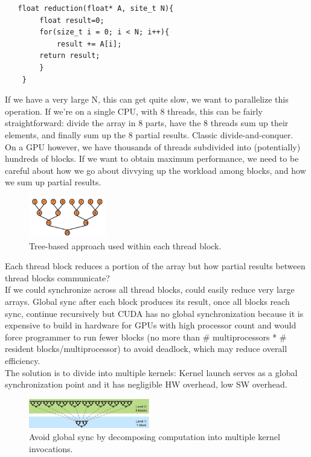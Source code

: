 \documentclass[10pt,twocolumn,letterpaper]{article}
\begin{document}
  \begin{lstlisting}
   float reduction(float* A, site_t N){
        float result=0;
        for(size_t i = 0; i < N; i++){
            result += A[i];
        return result;
        }
    }
    \end{lstlisting}

If we have a very large N, this can get quite slow, we want to parallelize this operation. If we’re on a single CPU, with 8 threads, this can be fairly straightforward: divide the array in 8 parts, have the 8 threads sum up their elements, and finally sum up the 8 partial results. Classic divide-and-conquer.\\
On a GPU however, we have thousands of threads subdivided into (potentially) hundreds of blocks. If we want to obtain maximum performance, we need to be careful about how we go about divvying up the workload among blocks, and how we sum up partial results.

\begin{figure}[H]
\begin{center}
\includegraphics[width=0.3\textwidth]{latex/red.png}
\caption{Tree-based approach used within each thread block.}
\label{etichetta}
\end{center}
\end{figure}

Each thread block reduces a portion of the array but how partial results between thread blocks communicate?\\
If we could synchronize across all thread blocks, could easily reduce very large arrays. Global sync after each block produces its result, once all blocks reach sync, continue recursively but CUDA has no global synchronization because it is expensive to build in hardware for GPUs with high processor count and would force programmer to run fewer blocks (no more than \# multiprocessors * \# resident blocks/multiprocessor) to avoid deadlock, which may reduce overall efficiency.\\
The solution is to divide into multiple kernels: Kernel launch serves as a global synchronization point and it has negligible HW overhead, low SW overhead.

\begin{figure}[H]
\begin{center}
\includegraphics[width=0.47\textwidth]{latex/red1.png}
\caption{Avoid global sync by decomposing computation into multiple kernel invocations.}
\label{etichetta}
\end{center}
\end{figure}
\end{document}

